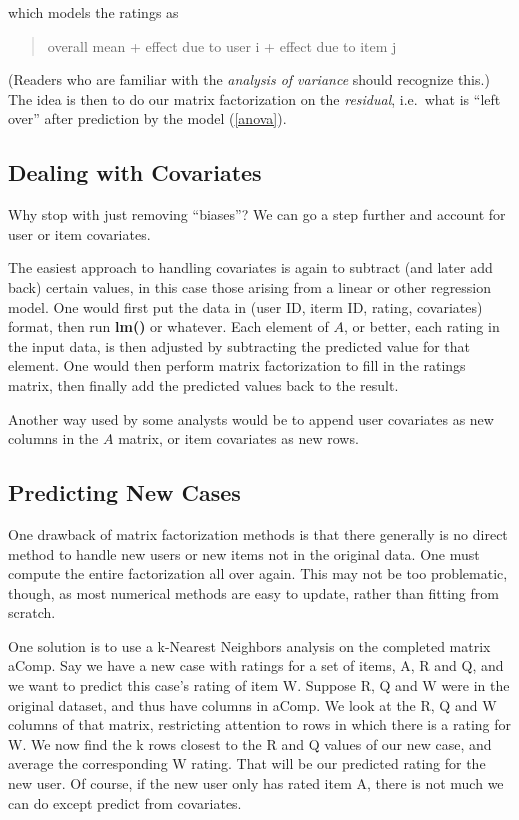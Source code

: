 which models the ratings as 

\begin{quote}

overall mean + effect due to user i + effect due to item j

\end{quote}

(Readers who are familiar with the \textit{analysis of variance}
should recognize this.)  The idea is then to do our matrix factorization
on the \textit{residual}, i.e.\ what is ``left over'' after prediction
by the model (\ref{anova}).

\subsection{Dealing with Covariates}

Why stop with just removing ``biases''?  We can go a step further and
account for user or item covariates.

The easiest approach to handling covariates is again to subtract (and
later add back) certain values, in this case those arising from a linear
or other regression model.  One would first put the data in (user ID,
iterm ID, rating, covariates) format, then run \textbf{lm()} or
whatever.  Each element of $A$, or better, each rating in the input
data, is then adjusted by subtracting the predicted value for that
element.  One would then perform matrix factorization to fill in the
ratings matrix, then finally add the predicted values back to the
result.

Another way used by some analysts would be to append user covariates as
new columns in the $A$ matrix, or item covariates as new rows.

\subsection{Predicting New Cases} 
\label{predictwh}

One drawback of matrix factorization methods is that there generally is
no direct method to handle new users or new items not in the original
data.  One must compute the entire factorization all over again.  This
may not be too problematic, though, as most numerical methods are easy to
update, rather than fitting from scratch.

One solution is to use a k-Nearest Neighbors analysis on the completed
matrix aComp.  Say we have a new case with ratings for a set of items, A, R
and Q, and we want to predict this case's rating of item W.  Suppose R,
Q and W were in the original dataset, and thus have columns in aComp.
We look at the R, Q and W columns of that matrix, restricting attention
to rows in which there is a rating for W.  We now find the k rows
closest to the R and Q values of our new case, and average the
corresponding W rating.  That will be our predicted rating for the new
user.  Of course, if the new user only has rated item A, there is not
much we can do except predict from covariates.

